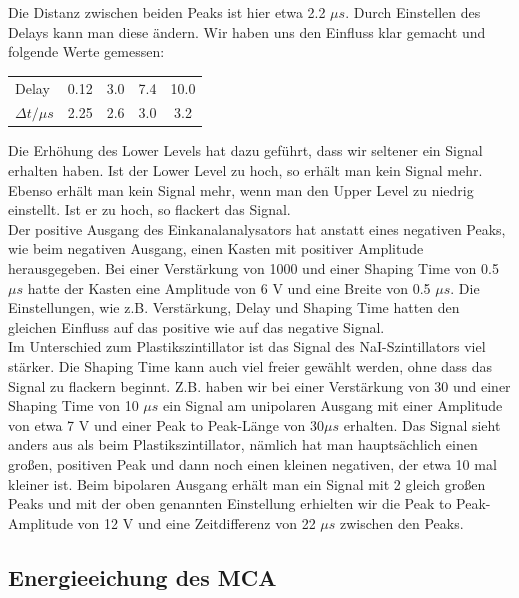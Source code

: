 Die Distanz zwischen beiden Peaks ist hier etwa 2.2 $\mu s$. Durch Einstellen des Delays kann man diese ändern. Wir haben uns den Einfluss klar gemacht und folgende Werte gemessen:\\

\begin{center}
\begin{tabular}{l c c c c}
Delay & 0.12 & 3.0 & 7.4 & 10.0\\
$\Delta t / \mu s$ & 2.25 & 2.6 & 3.0 & 3.2
\end{tabular}
\end{center}

Die Erhöhung des Lower Levels hat dazu geführt, dass wir seltener ein Signal erhalten haben. Ist der Lower Level zu hoch, so erhält man kein Signal mehr. Ebenso erhält man kein Signal mehr, wenn man den Upper Level zu niedrig einstellt. Ist er zu hoch, so flackert das Signal.\\

Der positive Ausgang des Einkanalanalysators hat anstatt eines negativen Peaks, wie beim negativen Ausgang, einen Kasten mit positiver Amplitude herausgegeben. Bei einer Verstärkung von 1000 und einer Shaping Time von 0.5 $\mu s$ hatte der Kasten eine Amplitude von 6 V und eine Breite von 0.5 $\mu s$. Die Einstellungen, wie z.B. Verstärkung, Delay und Shaping Time hatten den gleichen Einfluss auf das positive wie auf das negative Signal.\\

Im Unterschied zum Plastikszintillator ist das Signal des NaI-Szintillators viel stärker. Die Shaping Time kann auch viel freier gewählt werden, ohne dass das Signal zu flackern beginnt. Z.B. haben wir bei einer Verstärkung von 30 und einer Shaping Time von 10 $\mu s$ ein Signal am unipolaren Ausgang mit einer Amplitude von etwa 7 V und einer Peak to Peak-Länge von 30$\mu s$ erhalten. Das Signal sieht anders aus als beim Plastikszintillator, nämlich hat man hauptsächlich einen großen, positiven Peak und dann noch einen kleinen negativen, der etwa 10 mal kleiner ist. Beim bipolaren Ausgang erhält man ein Signal mit 2 gleich großen Peaks und mit der oben genannten Einstellung erhielten wir die Peak to Peak-Amplitude von 12 V und eine Zeitdifferenz von 22 $\mu s$ zwischen den Peaks.

\subsection{Energieeichung des MCA}

